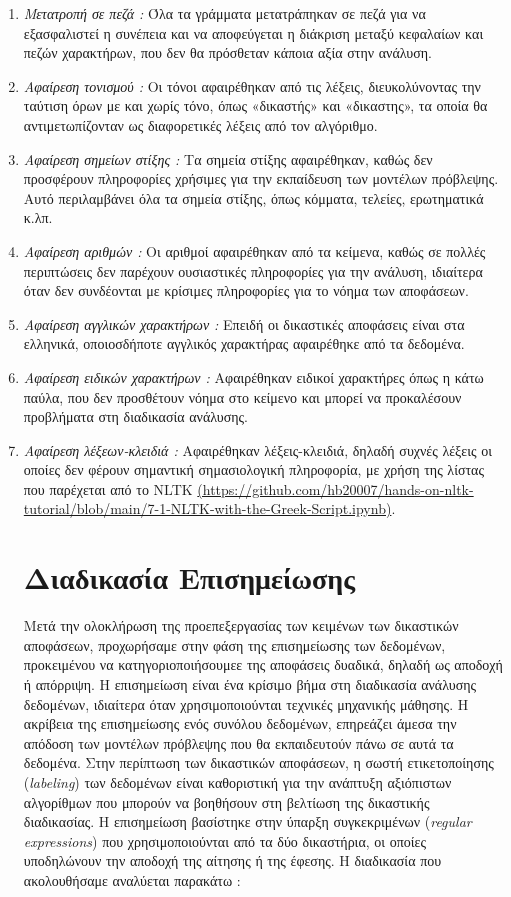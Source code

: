 \documentclass[diploma]{softlab-thesis}
\begin{document}
\begin{enumerate}
\item \textit{Μετατροπή σε πεζά :} Όλα τα γράμματα μετατράπηκαν σε πεζά για να εξασφαλιστεί η συνέπεια και να αποφεύγεται η διάκριση μεταξύ κεφαλαίων και πεζών χαρακτήρων, που δεν θα πρόσθεταν κάποια αξία στην ανάλυση.
\item \textit{Αφαίρεση τονισμού :} Οι τόνοι αφαιρέθηκαν από τις λέξεις, διευκολύνοντας την ταύτιση όρων με και χωρίς τόνο, όπως «δικαστής» και «δικαστης», τα οποία θα αντιμετωπίζονταν ως διαφορετικές λέξεις από τον αλγόριθμο.
\item \textit{Αφαίρεση σημείων στίξης :} Τα σημεία στίξης αφαιρέθηκαν, καθώς δεν προσφέρουν πληροφορίες χρήσιμες για την εκπαίδευση των μοντέλων πρόβλεψης. Αυτό περιλαμβάνει όλα τα σημεία στίξης, όπως κόμματα, τελείες, ερωτηματικά κ.λπ.
\item \textit{Αφαίρεση αριθμών :} Οι αριθμοί αφαιρέθηκαν από τα κείμενα, καθώς σε πολλές περιπτώσεις δεν παρέχουν ουσιαστικές πληροφορίες για την ανάλυση, ιδιαίτερα όταν δεν συνδέονται με κρίσιμες πληροφορίες για το νόημα των αποφάσεων.
\item \textit{Αφαίρεση αγγλικών χαρακτήρων :} Επειδή οι δικαστικές αποφάσεις είναι στα ελληνικά, οποιοσδήποτε αγγλικός χαρακτήρας αφαιρέθηκε από τα δεδομένα.
\item \textit{Αφαίρεση ειδικών χαρακτήρων :} Αφαιρέθηκαν ειδικοί χαρακτήρες όπως η κάτω παύλα, που δεν προσθέτουν νόημα στο κείμενο και μπορεί να προκαλέσουν προβλήματα στη διαδικασία ανάλυσης.
\item \textit{Αφαίρεση λέξεων-κλειδιά :} Αφαιρέθηκαν λέξεις-κλειδιά, δηλαδή συχνές λέξεις οι οποίες δεν φέρουν σημαντική σημασιολογική πληροφορία, με χρήση της λίστας που παρέχεται από το NLTK \href{https://github.com/hb20007/hands-on-nltk-tutorial/blob/main/7-1-NLTK-with-the-Greek-Script.ipynb}{(https://github.com/hb20007/hands-on-nltk-tutorial/blob/main/7-1-NLTK-with-the-Greek-Script.ipynb)}.

\section{Διαδικασία Επισημείωσης}

Μετά την ολοκλήρωση της προεπεξεργασίας των κειμένων των δικαστικών αποφάσεων, προχωρήσαμε στην φάση της επισημείωσης των δεδομένων, προκειμένου να κατηγοριοποιήσουμεε της αποφάσεις δυαδικά, δηλαδή ως αποδοχή ή απόρριψη. Η επισημείωση είναι ένα κρίσιμο βήμα στη διαδικασία ανάλυσης δεδομένων, ιδιαίτερα όταν χρησιμοποιούνται τεχνικές μηχανικής μάθησης. Η ακρίβεια της επισημείωσης ενός συνόλου δεδομένων, επηρεάζει άμεσα την απόδοση των μοντέλων πρόβλεψης που θα εκπαιδευτούν πάνω σε αυτά τα δεδομένα. Στην περίπτωση των δικαστικών αποφάσεων, η σωστή ετικετοποίησης (\textit{labeling}) των δεδομένων είναι καθοριστική για την ανάπτυξη αξιόπιστων αλγορίθμων που μπορούν να βοηθήσουν στη βελτίωση της δικαστικής διαδικασίας. 
Η επισημείωση βασίστηκε στην ύπαρξη συγκεκριμένων  (\textit{regular expressions}) που χρησιμοποιούνται από τα δύο δικαστήρια, οι οποίες υποδηλώνουν την αποδοχή της αίτησης ή της έφεσης. Η διαδικασία που ακολουθήσαμε αναλύεται παρακάτω :


\end{enumerate}
\end{document}
